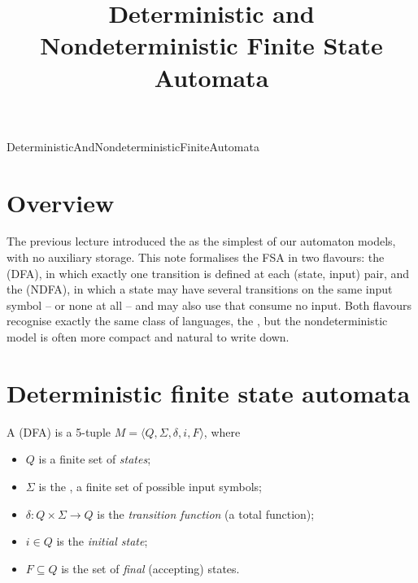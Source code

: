 \documentclass[hidelinks]{article}
\title{Deterministic and Nondeterministic Finite State Automata}
\author{}
\date{}
\begin{document}
\maketitle

\begin{smodule}[title={Deterministic and Nondeterministic Finite State Automata}]{DeterministicAndNondeterministicFiniteAutomata}


\section{Overview}

The previous lecture introduced the  as the simplest of our automaton models, with no auxiliary storage. This note formalises the FSA in two flavours: the  (DFA), in which exactly one transition is defined at each (state, input) pair, and the  (NDFA), in which a state may have several transitions on the same input symbol -- or none at all -- and may also use  that consume no input. Both flavours recognise exactly the same class of languages, the , but the nondeterministic model is often more compact and natural to write down.

\section{Deterministic finite state automata}

\begin{sdefinition}[for=deterministic finite-state automaton]
A  (DFA) is a 5-tuple $M = \langle Q, \Sigma, \delta, i, F \rangle$, where
\begin{itemize}
  \item $Q$ is a finite set of \emph{states};
  \item $\Sigma$ is the , a finite set of possible input symbols;
  \item $\delta : Q \times \Sigma \to Q$ is the \emph{transition function} (a total function);
  \item $i \in Q$ is the \emph{initial state};
  \item $F \subseteq Q$ is the set of \emph{final} (accepting) states.
\end{itemize}
\end{sdefinition}


\end{smodule}
\end{document}
